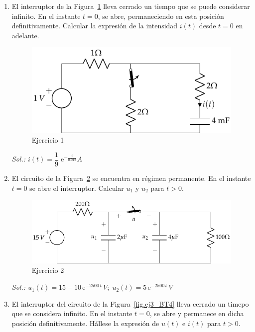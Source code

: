 	\begin{enumerate}
	    \item El interruptor de la Figura~\ref{fig.ej1_BT4} lleva cerrado un tiempo que se puede considerar infinito. En el instante $t=0$, se abre, permaneciendo en esta posición definitivamente. Calcular la expresión de la intensidad $i(t)$ desde $t=0$ en adelante.
	    \begin{figure}[H]
	        \centering
	        \includegraphics{../figs/ej1_BT4.pdf}
	        \caption{Ejercicio 1}
	        \label{fig.ej1_BT4}
	    \end{figure}
	    \emph{Sol.: $i(t)=\dfrac{1}{9}\; \mathrm{e}^{-\frac{t}{0.012}} A$}
	    \item El circuito de la Figura~\ref{fig.ej2_BT4} se encuentra en régimen permanente. En el instante $t=0$ se abre el interruptor. Calcular $u_1$ y $u_2$ para $t>0$. 
	    \begin{figure}[H]
	        \centering
	        \includegraphics{../figs/ej2_BT4.pdf}
	        \caption{Ejercicio 2}
	        \label{fig.ej2_BT4}
	    \end{figure}
	    \emph{Sol.: $u_1(t)=15-10\,\mathrm{e}^{-2500\,t}\,V;\; u_2(t)=5\,\mathrm{e}^{-2500\,t}\,V$}
	    \item El interruptor del circuito de la Figura~\ref{fig.ej3_BT4} lleva cerrado un timepo que se considera infinito. En el instante $t=0$, se abre y permanece en dicha posición definitivamente. Hállese la expresión de $u(t)$ e $i(t)$ para $t>0$.
	    \begin{figure}[H]

\end{figure}
\end{enumerate}
